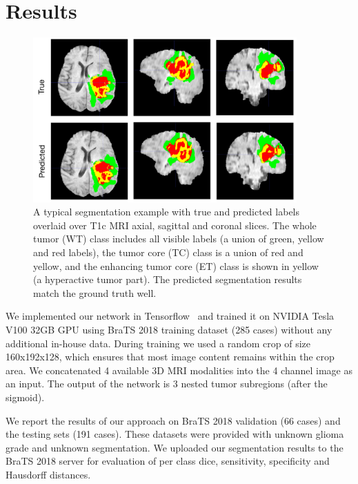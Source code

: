 \documentclass[runningheads]{llncs}
\begin{document}
 \section{Results}
 \label{sec:results}
 
   \begin{figure}[t] 
 	\centering
 	\includegraphics[clip=true, trim=0pt 0pt 0pt 0pt, width=0.9\textwidth]{seg.png}
 	\caption{A typical segmentation example with true and predicted labels overlaid over T1c MRI axial, sagittal and coronal slices.  The whole tumor (WT) class includes all visible labels (a union of green, yellow and red labels), the tumor core (TC) class is a union of red and yellow, and the enhancing tumor core (ET) class is shown in yellow (a hyperactive tumor part). The predicted segmentation results match the ground truth well.}
 	\label{fig:seg}
 	\vspace{-5mm}
 \end{figure}
 
 We implemented our network in Tensorflow~\cite{tensorflow2015} and trained it on NVIDIA Tesla V100 32GB GPU using BraTS 2018 training dataset (285 cases) without any additional in-house data. During training we used a random crop of size 160x192x128, which ensures that most image content remains within the crop area. We concatenated  4 available 3D MRI modalities into the 4 channel image as an input. The output of the network is 3 nested tumor subregions (after the sigmoid).
 
 We report the results of our approach  on BraTS 2018 validation (66 cases) and the testing sets (191 cases). These datasets were provided with unknown glioma grade and unknown segmentation. We uploaded our segmentation results to the BraTS 2018 server for evaluation of per class dice, sensitivity, specificity and Hausdorff distances. 
 
\end{document}
